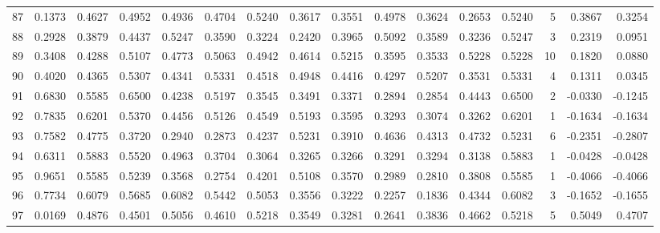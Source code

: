 \begin{tabular}{lrrrrrrrrrrrrrrr}
87  &      0.1373 &  0.4627 &  0.4952 &  0.4936 &  0.4704 &  0.5240 &  0.3617 &  0.3551 &  0.4978 &  0.3624 &   0.2653 &     0.5240 &      5 &                    0.3867 &                     0.3254 \\
88  &      0.2928 &  0.3879 &  0.4437 &  0.5247 &  0.3590 &  0.3224 &  0.2420 &  0.3965 &  0.5092 &  0.3589 &   0.3236 &     0.5247 &      3 &                    0.2319 &                     0.0951 \\
89  &      0.3408 &  0.4288 &  0.5107 &  0.4773 &  0.5063 &  0.4942 &  0.4614 &  0.5215 &  0.3595 &  0.3533 &   0.5228 &     0.5228 &     10 &                    0.1820 &                     0.0880 \\
90  &      0.4020 &  0.4365 &  0.5307 &  0.4341 &  0.5331 &  0.4518 &  0.4948 &  0.4416 &  0.4297 &  0.5207 &   0.3531 &     0.5331 &      4 &                    0.1311 &                     0.0345 \\
91  &      0.6830 &  0.5585 &  0.6500 &  0.4238 &  0.5197 &  0.3545 &  0.3491 &  0.3371 &  0.2894 &  0.2854 &   0.4443 &     0.6500 &      2 &                   -0.0330 &                    -0.1245 \\
92  &      0.7835 &  0.6201 &  0.5370 &  0.4456 &  0.5126 &  0.4549 &  0.5193 &  0.3595 &  0.3293 &  0.3074 &   0.3262 &     0.6201 &      1 &                   -0.1634 &                    -0.1634 \\
93  &      0.7582 &  0.4775 &  0.3720 &  0.2940 &  0.2873 &  0.4237 &  0.5231 &  0.3910 &  0.4636 &  0.4313 &   0.4732 &     0.5231 &      6 &                   -0.2351 &                    -0.2807 \\
94  &      0.6311 &  0.5883 &  0.5520 &  0.4963 &  0.3704 &  0.3064 &  0.3265 &  0.3266 &  0.3291 &  0.3294 &   0.3138 &     0.5883 &      1 &                   -0.0428 &                    -0.0428 \\
95  &      0.9651 &  0.5585 &  0.5239 &  0.3568 &  0.2754 &  0.4201 &  0.5108 &  0.3570 &  0.2989 &  0.2810 &   0.3808 &     0.5585 &      1 &                   -0.4066 &                    -0.4066 \\
96  &      0.7734 &  0.6079 &  0.5685 &  0.6082 &  0.5442 &  0.5053 &  0.3556 &  0.3222 &  0.2257 &  0.1836 &   0.4344 &     0.6082 &      3 &                   -0.1652 &                    -0.1655 \\
97  &      0.0169 &  0.4876 &  0.4501 &  0.5056 &  0.4610 &  0.5218 &  0.3549 &  0.3281 &  0.2641 &  0.3836 &   0.4662 &     0.5218 &      5 &                    0.5049 &                     0.4707 \\

\end{tabular}
